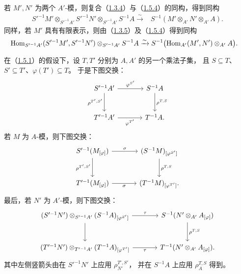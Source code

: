 若 $M',N'$ 为两个 $A'$-模，则复合（\hyperlink{para:0:1.3.4}{1.3.4}）与（\hyperlink{para:0:1.5.4}{1.5.4}）的同构，得到同构
\[
 \begin{split}
 S'^{-1}M'\otimes_{S'^{-1}A'}S'^{-1}N'\otimes_{S'^{-1}A'}S^{-1}A
 \xrightarrow{\sim}{}&
 S^{-1}(M'\otimes_{A'}N'\otimes_{A'}A).
 \end{split}
\]
同样，若 $M'$ 具有有限表示，则由（\hyperlink{para:0:1.3.5}{1.3.5}）及（\hyperlink{para:0:1.5.4}{1.5.4}）得到同构
\[
 \begin{split}
 \operatorname{Hom}_{S'^{-1}A'}(S'^{-1}M',S'^{-1}N')\otimes_{S'^{-1}A'}S^{-1}A
 \xrightarrow{\sim}{}& S^{-1}\bigl(\operatorname{Hom}_{A'}(M',N')\otimes_{A'}A\bigr).
 \end{split}
\]

在（\hyperlink{para:0:1.5.1}{1.5.1}）的假设下，设 $T,T'$ 分别为 $A,A'$ 的另一个乘法子集，
且 $S\subseteq T$、$S'\subseteq T'$、$\varphi(T')\subseteq T$。
于是下图交换：
\[
\begin{tikzcd}[column sep=large,row sep=large]
 S'^{-1}A' \arrow[r,"\varphi^{S'}"] \arrow[d,"\rho^{T',S'}"'] & S^{-1}A \arrow[d,"\rho^{T,S}"]\\
 T'^{-1}A' \arrow[r,"\varphi^{T'}"'] & T^{-1}A.
\end{tikzcd}
\]
若 $M$ 为 $A$-模，则下图交换：
\[
\begin{tikzcd}[column sep=large,row sep=large]
 S'^{-1}(M_{[\varphi]}) \arrow[r,"\sigma"] \arrow[d,"\rho^{T',S'}"'] & (S^{-1}M)_{[\varphi^{S'}]} \arrow[d,"\rho^{T,S}"]\\
 T'^{-1}(M_{[\varphi]}) \arrow[r,"\sigma"'] & (T^{-1}M)_{[\varphi^{T'}]}.
\end{tikzcd}
\]
最后，若 $N'$ 为 $A'$-模，则下图交换：
\[
\begin{tikzcd}[column sep=large,row sep=large]
 (S'^{-1}N')\otimes_{S'^{-1}A'}(S^{-1}A)_{[\varphi^{S'}]}
 \arrow[r,"\tau"] \arrow[d]
 & S^{-1}(N'\otimes_{A'}A_{[\varphi]}) \arrow[d,"\rho^{T,S}"]\\
 (T'^{-1}N')\otimes_{T'^{-1}A'}(T^{-1}A)_{[\varphi^{T'}]}
 \arrow[r,"\tau"'] & T^{-1}(N'\otimes_{A'}A_{[\varphi]}).
\end{tikzcd}
\]
其中左侧竖箭头由在 $S'^{-1}N'$ 上应用 $\rho_{N'}^{T',S'}$，
并在 $S^{-1}A$ 上应用 $\rho_A^{T,S}$ 得到。

